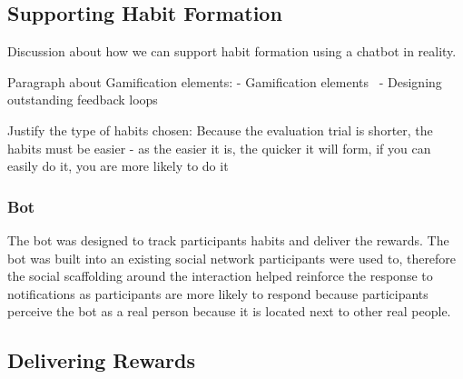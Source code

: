 \subsection*{Supporting Habit Formation}

Discussion about how we can support habit formation using a chatbot in reality.

Paragraph about Gamification elements:
- Gamification elements~\cite{article_free_to_play_making_money_from_games_you_give_away}
- Designing outstanding feedback loops~\cite{website_how_to_design_feedback_loops}

Justify the type of habits chosen: Because the evaluation trial is shorter, the habits must be easier - as the easier it is, the quicker it will form, if you can easily do it, you are more likely to do it


\subsubsection*{Bot}
The bot was designed to track participants habits and deliver the rewards. The bot was built into an existing social network participants were used to, therefore the social scaffolding around the interaction helped reinforce the response to notifications as participants are more likely to respond because participants perceive the bot as a real person because it is located next to other real people.

\subsection*{Delivering Rewards}

